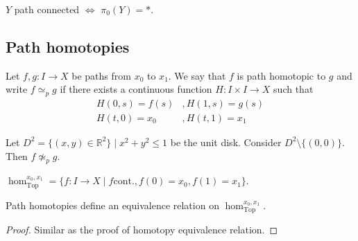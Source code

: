 \( Y \) path connected \( \iff \) \( \pi_0(Y) = * \).

\subsection{Path homotopies}

\begin{definition}
   Let \( f,g: I \to X \) be paths from
   \( x_0 \) to \( x_1 \).
    We say that \( f \) is path homotopic
    to \( g \) and write \( f \simeq_{p} g \) if
    there exists a continuous function
    \( H: I \times I \to X \) such that
    \begin{align*}
      H(0, s) = f(s)&, H(1, s) = g(s) \\
      H(t, 0) = x_0&, H(t, 1) = x_1
    \end{align*}
\end{definition}

\begin{example}
    Let \( D^2 = \{ (x, y) \in \mathbb{R}^2 \} \mid x^2 + y^2 \le 1  \)
    be the unit disk. Consider \( D^2 \setminus \{ (0, 0) \}  \).
    Then \( f \not\simeq_p g \).
    \begin{center}
    \end{center}
\end{example}

\begin{definition}
  \( \hom_{\text{Top}}^{x_0, x_1} = \{ f: I \to X \mid f \text{cont.}, f(0) = x_0, f(1) = x_1  \}  \).
\end{definition}

\begin{theorem}
    Path homotopies define an equivalence relation on \( \hom_{\text{Top}}^{x_0, x_1} \).
\end{theorem}

\begin{proof}
    Similar as the proof of homotopy equivalence relation.
\end{proof}
